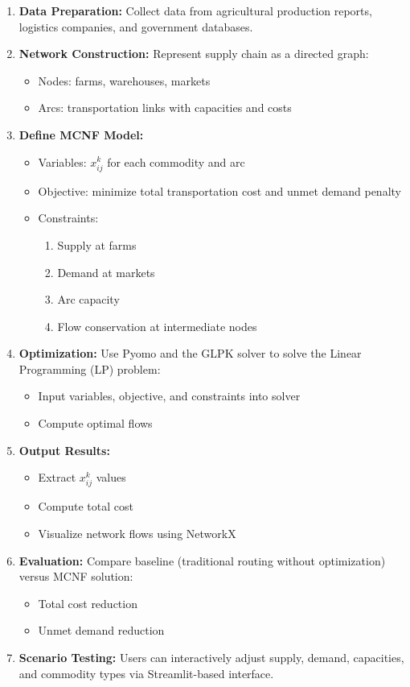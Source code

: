 \documentclass{icsthesis}
\begin{document}
\begin{mainmatter}
\begin{enumerate}
    \item \textbf{Data Preparation:} Collect data from agricultural production reports, logistics companies, and government databases.
    \item \textbf{Network Construction:} Represent supply chain as a directed graph:
    \begin{itemize}
        \item Nodes: farms, warehouses, markets
        \item Arcs: transportation links with capacities and costs
    \end{itemize}
    \item \textbf{Define MCNF Model:}
    \begin{itemize}
        \item Variables: $x_{ij}^k$ for each commodity and arc
        \item Objective: minimize total transportation cost and unmet demand penalty
        \item Constraints:
        \begin{enumerate}
            \item Supply at farms
            \item Demand at markets
            \item Arc capacity
            \item Flow conservation at intermediate nodes
        \end{enumerate}
    \end{itemize}
    \item \textbf{Optimization:} Use Pyomo and the GLPK solver to solve the Linear Programming (LP) problem:
    \begin{itemize}
        \item Input variables, objective, and constraints into solver
        \item Compute optimal flows
    \end{itemize}
    \item \textbf{Output Results:} 
    \begin{itemize}
        \item Extract $x_{ij}^k$ values
        \item Compute total cost
        \item Visualize network flows using NetworkX
    \end{itemize}
    \item \textbf{Evaluation:} Compare baseline (traditional routing without optimization) versus MCNF solution:
    \begin{itemize}
        \item Total cost reduction
        \item Unmet demand reduction
    \end{itemize}
    \item \textbf{Scenario Testing:} Users can interactively adjust supply, demand, capacities, and commodity types via Streamlit-based interface.
\end{enumerate}




\end{mainmatter}
\end{document}
